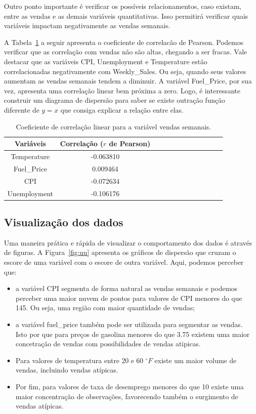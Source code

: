 \documentclass[letterpaper,11pt]{article}
\begin{document}
Outro ponto importante é verificar os possíveis relacionamentos, caso existam, entre as vendas e as demais variáveis quantitativas. Isso permitirá verificar quais variáveis impactam negativamente as vendas semanais.

A Tabela~\ref{table33} a seguir apresenta o coeficiente de correlacão de Pearson. Podemos verificar que as correlação com vendas não são altas, chegando a ser fracas. Vale destacar que as variáveis CPI, Unemployment e Temperature estão correlacionadas negativamente com Weekly\_Sales. Ou seja, quando seus valores aumentam as vendas semanais tendem a diminuir. A variável Fuel\_Price, por sua vez, apresenta uma correlação linear bem próxima a zero. Logo, é interessante construir um diagrama de dispersão para saber se existe outração função diferente de $y = x$ que consiga explicar a relação entre elas.

\begin{table}[!htb]
\begin{center}
\caption{Coeficiente de correlação linear para a variável vendas semanais.}
\label{table33} 
\begin{tabular}{cccccccccccc} 
\hline
Variáveis & Correlação ($r$ de Pearson) \\
\hline
Temperature	&-0.063810 \\
Fuel_Price& 0.009464 \\
CPI& -0.072634\\
Unemployment	& -0.106176 \\

\hline
\end{tabular}
\end{center}
\end{table}

\subsection{Visualização dos dados}

Uma maneira prática e rápida de visualizar o comportamento dos dados é através de figuras. A Figura~\ref{fig:uu} apresenta os gráficos de dispersão que cruzam o escore de uma variável com o escore de outra variável. Aqui, podemos perceber que:
\begin{itemize}
    \item a variável CPI segmenta de forma natural as vendas semanais e podemos perceber uma maior nuvem de pontos para valores de CPI menores do que 145. Ou seja, uma região com maior quantidade de vendas;
    \item a variável fuel\_price também pode ser utilizada para segmentar as vendas. Isto por que para preços de gasolina menores do que 3.75 existem uma maior concetração de vendas com possibilidades de vendas atipicas. 
    \item Para valores de temperatura entre 20 e 60 $^{\circ}F$ existe um maior volume de vendas, incluindo vendas atípicas.
    \item Por fim, para valores de taxa de desemprego menores do que 10 existe uma maior concentração de observações, favorecendo também o surgimento de vendas atípicas.
\end{itemize}
\end{document}
